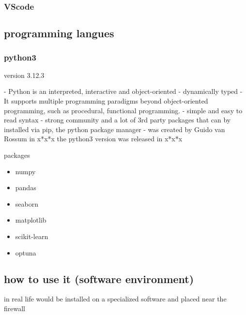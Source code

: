 \subsubsection{VScode}



\subsection{programming langues}
\subsubsection{python3}
version 3.12.3 




- Python is an interpreted, interactive and object-oriented
- dynamically typed
- It supports multiple programming paradigms beyond object-oriented programming, such as procedural, functional programming.
- simple and easy to read syntax
- strong community and a lot of 3rd party packages that can by installed via pip, the python package manager
- was created by Guido van Rossum in x*x*x the python3 version was released in x*x*x




packages
\begin{itemize}
	\item numpy


	\item pandas



	\item seaborn
	

	\item matplotlib
	

	\item scikit-learn
	

	\item optuna
	
	
\end{itemize}




\subsection{how to use it (software environment)}
in real life would be installed on a specialized software and placed near the firewall

